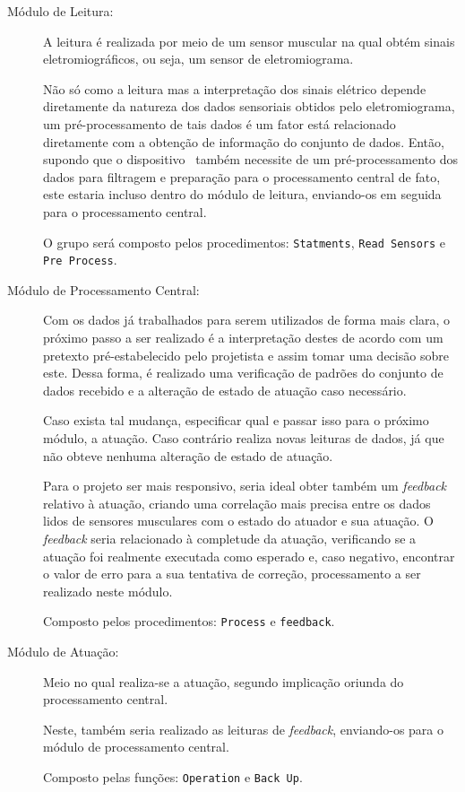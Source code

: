          \begin{description}
            \item [Módulo de Leitura:]
            A leitura é realizada por meio de um sensor muscular na qual obtém sinais eletromiográficos, ou seja, um sensor de eletromiograma.

            Não só como a leitura mas a interpretação dos sinais elétrico depende diretamente da natureza dos dados sensoriais obtidos pelo eletromiograma, um pré-processamento de tais dados é um fator está relacionado diretamente com a obtenção de informação do conjunto de dados.
            Então, supondo que o dispositivo \wearable\ também necessite de um pré-processamento dos dados para filtragem e preparação para o processamento central de fato, este estaria incluso dentro do módulo de leitura, enviando-os em seguida para o processamento central.
            
            O grupo será composto pelos procedimentos: \texttt{Statments}, \texttt{Read Sensors} e \texttt{Pre Process}.

            \item [Módulo de Processamento Central:]
            Com os dados já trabalhados para serem utilizados de forma mais clara, o próximo passo a ser realizado é a interpretação destes de acordo com um pretexto pré-estabelecido pelo projetista e assim tomar uma decisão sobre este.
            Dessa forma, é realizado uma verificação de padrões do conjunto de dados recebido e a alteração de estado de atuação caso necessário.

            Caso exista tal mudança, especificar qual e passar isso para o próximo módulo, a atuação.
            Caso contrário realiza novas leituras de dados, já que não obteve nenhuma alteração de estado de atuação.

            Para o projeto ser mais responsivo, seria ideal obter também um \textit{feedback} relativo à atuação, criando uma correlação mais precisa entre os dados lidos de sensores musculares com o estado do atuador e sua atuação.
            O \textit{feedback} seria relacionado à completude da atuação, verificando se a atuação foi realmente executada como esperado e, caso negativo, encontrar o valor de erro para a sua tentativa de correção, processamento a ser realizado neste módulo.
            
            Composto pelos procedimentos: \texttt{Process} e \texttt{feedback}.

            \item [Módulo de Atuação:]
            Meio no qual realiza-se a atuação, segundo implicação oriunda do processamento central.

            Neste, também seria realizado as leituras de \textit{feedback}, enviando-os para o módulo de processamento central.
            
            Composto pelas funções: \texttt{Operation} e \texttt{Back Up}.
         \end{description}

